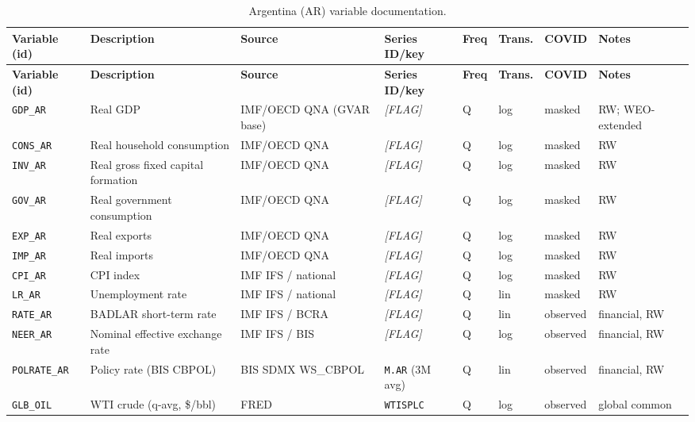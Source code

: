 {\footnotesize
\begin{longtable}{p{2.3cm}p{3.3cm}p{2.1cm}p{2.2cm}p{0.6cm}p{1.4cm}p{1.9cm}p{2.4cm}}
\caption{Argentina (AR) variable documentation.}\label{tab:data:AR}\\
\toprule
\textbf{Variable (id)} & \textbf{Description} & \textbf{Source} & \textbf{Series ID/key} & \textbf{Freq} & \textbf{Trans.} & \textbf{COVID} & \textbf{Notes} \\
\midrule
\endfirsthead
\toprule
\textbf{Variable (id)} & \textbf{Description} & \textbf{Source} & \textbf{Series ID/key} & \textbf{Freq} & \textbf{Trans.} & \textbf{COVID} & \textbf{Notes} \\
\midrule
\endhead
\bottomrule
\endfoot
\texttt{GDP\_AR}    & Real GDP                           & IMF/OECD QNA (GVAR base) & \textit{[FLAG]} & Q & log & masked & RW; WEO-extended \\
\texttt{CONS\_AR}   & Real household consumption         & IMF/OECD QNA & \textit{[FLAG]} & Q & log & masked & RW \\
\texttt{INV\_AR}    & Real gross fixed capital formation & IMF/OECD QNA & \textit{[FLAG]} & Q & log & masked & RW \\
\texttt{GOV\_AR}    & Real government consumption        & IMF/OECD QNA & \textit{[FLAG]} & Q & log & masked & RW \\
\texttt{EXP\_AR}    & Real exports                       & IMF/OECD QNA & \textit{[FLAG]} & Q & log & masked & RW \\
\texttt{IMP\_AR}    & Real imports                       & IMF/OECD QNA & \textit{[FLAG]} & Q & log & masked & RW \\
\texttt{CPI\_AR}    & CPI index                          & IMF IFS / national & \textit{[FLAG]} & Q & log & masked & RW \\
\texttt{LR\_AR}     & Unemployment rate                  & IMF IFS / national & \textit{[FLAG]} & Q & lin & masked & RW \\
\texttt{RATE\_AR}   & BADLAR short-term rate             & IMF IFS / BCRA & \textit{[FLAG]} & Q & lin & observed & financial, RW \\
\texttt{NEER\_AR}   & Nominal effective exchange rate    & IMF IFS / BIS & \textit{[FLAG]} & Q & log & observed & financial, RW \\
\texttt{POLRATE\_AR}& Policy rate (BIS CBPOL)            & BIS SDMX WS\_CBPOL & \texttt{M.AR} (3M avg) & Q & lin & observed & financial, RW \\
\texttt{GLB\_OIL}   & WTI crude (q-avg, \$/bbl)          & FRED & \texttt{WTISPLC} & Q & log & observed & global common \\

\end{longtable}}
